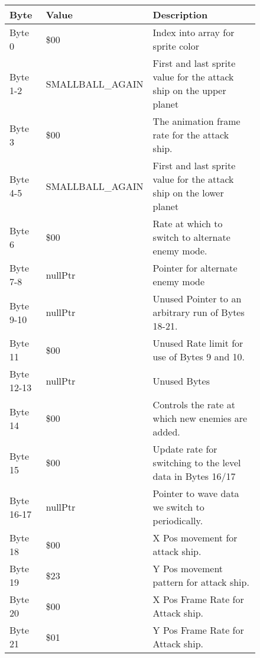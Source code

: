 \begin{figure}[H]
{\begin{adjustbox}{width=12cm}
\begin{tabular}{lll}
\toprule
 Byte       & Value                      & Description                                                         \\
\midrule
 Byte 0     & \$00                        & Index into array for sprite color                                   \\
 Byte 1-2   & SMALLBALL\_AGAIN            & First and last sprite value for the attack ship on the upper planet \\
 Byte 3     & \$00                        & The animation frame rate for the attack ship.                       \\
 Byte 4-5   & SMALLBALL\_AGAIN            & First and last sprite value for the attack ship on the lower planet \\
 Byte 6     & \$00                        & Rate at which to switch to alternate enemy mode.                    \\
 Byte 7-8   & nullPtr                    & Pointer for alternate enemy mode                                    \\
 Byte 9-10  & nullPtr                    & Unused Pointer to an arbitrary run of Bytes 18-21.                  \\
 Byte 11    & \$00                        & Unused Rate limit for use of Bytes 9 and 10.                        \\
 Byte 12-13 & nullPtr                    & Unused Bytes                                                        \\
 Byte 14    & \$00                        & Controls the rate at which new enemies are added.                   \\
 Byte 15    & \$00                        & Update rate for switching to the level data in Bytes 16/17          \\
 Byte 16-17 & nullPtr                    & Pointer to wave data we switch to periodically.                     \\
 Byte 18    & \$00                        & X Pos movement for attack ship.                                     \\
 Byte 19    & \$23                        & Y Pos movement pattern for attack ship.                             \\
 Byte 20    & \$00                        & X Pos Frame Rate for Attack ship.                                   \\
 Byte 21    & \$01                        & Y Pos Frame Rate for Attack ship.                                   \\

\end{tabular}
\end{adjustbox}}
\end{figure}
